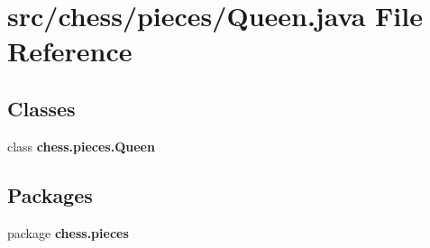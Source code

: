 \section{src/chess/pieces/\+Queen.java File Reference}
\label{_queen_8java}
\subsection*{Classes}
\begin{DoxyCompactItemize}
\item 
class {\bf chess.\+pieces.\+Queen}
\end{DoxyCompactItemize}
\subsection*{Packages}
\begin{DoxyCompactItemize}
\item 
package {\bf chess.\+pieces}
\end{DoxyCompactItemize}
